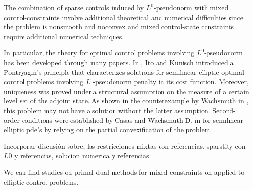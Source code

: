 \documentclass[11pt,a4paper]{amsart}
\begin{document}
The combination of sparse controls induced by  $L^0$-pseudonorm with  mixed control-constraints involve additional theoretical and numerical difficulties since the problem is nonsmooth and noconvex and mixed control-state constraints require additional numerical techniques. 

In particular, the theory for optimal control problems involving $L^0$-pseudonorm has been developed through many papers. In \cite{itokun14}, Ito and Kunisch introduced a Pontryagin's principle that characterizes solutions for semilinear elliptic optimal control problems involving $L^0$-pseudonorm penalty in its cost function. Moreover, uniqueness was proved under a structural assumption on the measure of a certain level set of the adjoint state. As shown in the counterexample by Wachsmuth in \cite{}, this problem may not have a solution without the latter assumption. 
Second-order conditions were established by Casas and Wachsmuth D. in \cite{} for semilinear elliptic pde's by relying on the partial convexification of the problem.

{\color{red} Incorporar discusión sobre, las restricciones mixtas con referencias, sparstity con $L0$ y referencias, solucion numerica y referencias}

We can find studies on primal-dual methods for mixed constraints on \cite{hint07} applied to elliptic control problems. 




\end{document}
